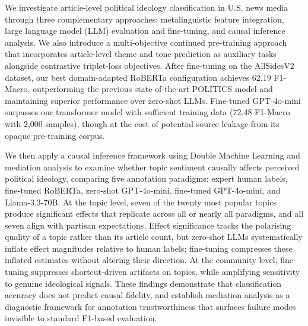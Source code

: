We investigate article-level political ideology classification in U.S. news media through three complementary approaches: metalinguistic feature integration, large language model (LLM) evaluation and fine-tuning, and causal inference analysis. We also introduce a multi-objective continued pre-training approach that incorporates article-level theme and tone prediction as auxiliary tasks alongside contrastive triplet-loss objectives. After fine-tuning on the AllSidesV2 dataset, our best domain-adapted RoBERTa configuration achieves 62.19 F1-Macro, outperforming the previous state-of-the-art POLITICS model and maintaining superior performance over zero-shot LLMs. Fine-tuned GPT-4o-mini surpasses our transformer model with sufficient training data (72.48 F1-Macro with 2,000 samples), though at the cost of potential source leakage from its opaque pre-training corpus.

We then apply a causal inference framework using Double Machine Learning and mediation analysis to examine whether topic sentiment causally affects perceived political ideology, comparing five annotation paradigms: expert human labels, fine-tuned RoBERTa, zero-shot GPT-4o-mini, fine-tuned GPT-4o-mini, and Llama-3.3-70B. At the topic level, seven of the twenty most popular topics produce significant effects that replicate across all or nearly all paradigms, and all seven align with partisan expectations. Effect significance tracks the polarising quality of a topic rather than its article count, but zero-shot LLMs systematically inflate effect magnitudes relative to human labels; fine-tuning compresses these inflated estimates without altering their direction. At the community level, fine-tuning suppresses shortcut-driven artifacts on topics, while amplifying sensitivity to genuine ideological signals. These findings demonstrate that classification accuracy does not predict causal fidelity, and establish mediation analysis as a diagnostic framework for annotation trustworthiness that surfaces failure modes invisible to standard F1-based evaluation.
